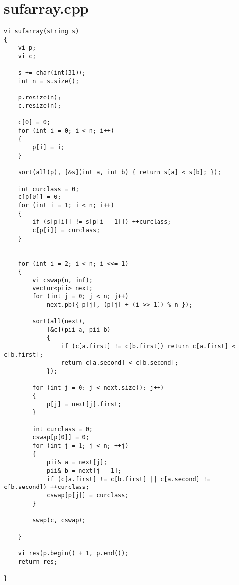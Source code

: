 \documentclass[a4paper,12pt]{report}
\begin{document}
\section{sufarray.cpp}
\begin{lstlisting}
vi sufarray(string s)
{
    vi p;
    vi c;

    s += char(int(31));
    int n = s.size();

    p.resize(n);
    c.resize(n);

    c[0] = 0;
    for (int i = 0; i < n; i++)
    {
        p[i] = i;
    }

    sort(all(p), [&s](int a, int b) { return s[a] < s[b]; });

    int curclass = 0;
    c[p[0]] = 0;
    for (int i = 1; i < n; i++)
    {
        if (s[p[i]] != s[p[i - 1]]) ++curclass;
        c[p[i]] = curclass;
    }


    for (int i = 2; i < n; i <<= 1)
    {
        vi cswap(n, inf);
        vector<pii> next;
        for (int j = 0; j < n; j++)
            next.pb({ p[j], (p[j] + (i >> 1)) % n });

        sort(all(next),
            [&c](pii a, pii b)
            {
                if (c[a.first] != c[b.first]) return c[a.first] < c[b.first];
                return c[a.second] < c[b.second];
            });

        for (int j = 0; j < next.size(); j++)
        {
            p[j] = next[j].first;
        }

        int curclass = 0;
        cswap[p[0]] = 0;
        for (int j = 1; j < n; ++j)
        {
            pii& a = next[j];
            pii& b = next[j - 1];
            if (c[a.first] != c[b.first] || c[a.second] != c[b.second]) ++curclass;
            cswap[p[j]] = curclass;
        }

        swap(c, cswap);

    }

    vi res(p.begin() + 1, p.end());
    return res;

}

\end{lstlisting}
\end{document}
